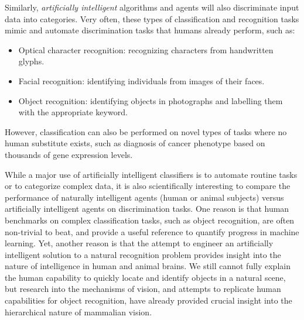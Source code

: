 Similarly, \emph{artificially intelligent} algorithms and agents will
also discriminate input data into categories.  Very often, these types
of classification and recognition tasks mimic and automate
discrimination tasks that humans already perform, such as:
\begin{itemize}
\item Optical character recognition: recognizing characters from handwritten glyphs.
\item Facial recognition: identifying individuals from images of their faces.
\item Object recognition: identifying objects in photographs and labelling them with the appropriate keyword.
\end{itemize}
However, classification can also be performed on novel types of tasks
where no human substitute exists, such as diagnosis of cancer
phenotype based on thousands of gene expression levels.

While a major use of artificially intelligent classifiers is to
automate routine tasks or to categorize complex data, it is also
scientifically interesting to compare the performance of naturally
intelligent agents (human or animal subjects) versus artificially
intelligent agents on discrimination tasks.  One reason is that human
benchmarks on complex classification tasks, such as object
recognition, are often non-trivial to beat, and provide a useful
reference to quantify progress in machine learning.  Yet, another
reason is that the attempt to engineer an artificially intelligent
solution to a natural recognition problem provides insight into the
nature of intelligence in human and animal brains.  We still cannot
fully explain the human capability to quickly locate and identify
objects in a natural scene, but research into the mechanisms of
vision, and attempts to replicate human capabilities for object
recognition, have already provided crucial insight into the
hierarchical nature of mammalian vision.  %


